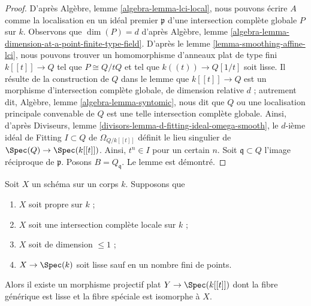 \begin{proof}
D'après Algèbre, lemme \ref{algebra-lemma-lci-local}, nous pouvons écrire $A$ comme la
localisation en un idéal premier $\mathfrak p$ d'une intersection complète globale $P$
sur $k$. Observons que $\dim(P) = d$ d'après
Algèbre, lemme \ref{algebra-lemma-dimension-at-a-point-finite-type-field}.
D'après le lemme \ref{lemma-smoothing-affine-lci}, nous pouvons trouver un
homomorphisme d'anneaux plat de type fini $k[[t]] \to Q$ tel que $P \cong Q/tQ$ et
tel que $k((t)) \to Q[1/t]$ soit lisse. Il résulte de la construction
de $Q$ dans le lemme que $k[[t]] \to Q$ est un morphisme
d'intersection complète globale, de dimension relative $d$ ; autrement dit,
Algèbre, lemme \ref{algebra-lemma-syntomic}, nous dit que $Q$ ou une
localisation principale convenable de $Q$ est une telle intersection complète globale.
Ainsi, d'après Diviseurs, lemme \ref{divisors-lemma-d-fitting-ideal-omega-smooth},
le $d$-ième idéal de Fitting $I \subset Q$ de $\Omega_{Q/k[[t]]}$
définit le lieu singulier de $\Spec(Q) \to \Spec(k[[t]])$.
Ainsi, $t^n \in I$ pour un certain $n$.
Soit $\mathfrak q \subset Q$
l'image réciproque de $\mathfrak p$. Posons $B = Q_\mathfrak q$.
Le lemme est démontré.
\end{proof}

\begin{lemma}
\label{lemma-smoothing-proper-curve-isolated-lci}
Soit $X$ un schéma sur un corps $k$. Supposons que
\begin{enumerate}
\item $X$ soit propre sur $k$ ;
\item $X$ soit une intersection complète locale sur $k$ ;
\item $X$ soit de dimension $\leq 1$ ;
\item $X \to \Spec(k)$ soit lisse sauf en un nombre fini de points.
\end{enumerate}
Alors il existe un morphisme projectif plat $Y \to \Spec(k[[t]])$
dont la fibre générique est lisse et la fibre spéciale
est isomorphe à $X$.
\end{lemma}

